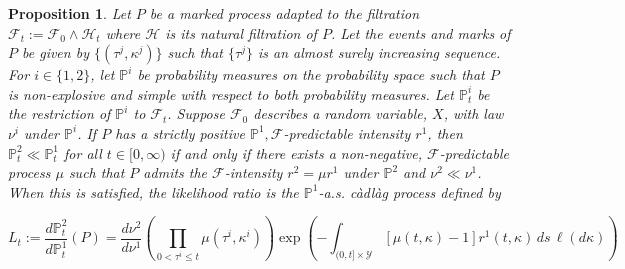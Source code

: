 \documentclass[12pt]{article}
\newcommand{\mb}{\mathbb}
\newcommand{\mc}{\mathcal}
\newcommand{\pr}{\mb{P}}							%
\newcommand{\indx}[1]{^{#1}}						%
\newcommand{\Xf}{X}									%
\newcommand{\Sm}{\ell}								%
\newcommand{\rate}{r}								%
\newcommand{\F}{\mc{F}}								%
\newcommand{\m}{\mu}								%
\newcommand{\tpara}[1]{_{#1}}						%
\newcommand{\spce}{\mc{Y}}							%
\newcommand{\rt}{\tau}								%
\renewcommand{\mark}{\kappa}						%
\newcommand{\rp}{P}									%
\newcommand{\mm}{\nu}								%
\newtheorem{prop}[thms]{Proposition}
\begin{document}
\begin{prop}
Let \(\rp\) be a marked process adapted to the filtration \(\F\tpara{t} := \F\tpara{0}\wedge \mc{H}\tpara{t}\) where \(\mc{H}\) is its natural filtration of \(\rp\). Let the events and marks of \(\rp\) be given by \(\{(\rt\indx{j},\mark\indx{j})\}\) such that \(\{\rt\indx{j}\}\) is an almost surely increasing sequence. For \(i \in \{1,2\}\), let \(\pr\indx{i}\) be probability measures on the probability space such that \(\rp\) is non-explosive and simple with respect to both probability measures. Let \(\pr\indx{i}\tpara{t}\) be the restriction of \(\pr\indx{i}\) to \(\F\tpara{t}\). Suppose \(\F\tpara{0}\) describes a random variable, \(\Xf\), with law \(\mm\indx{i}\) under \(\pr\indx{i}\). If \(\rp\) has a strictly positive \(\pr\indx{1},\F\)-predictable intensity \(\rate\indx{1}\), then \(\pr\indx{2}\tpara{t} \ll \pr\indx{1}\tpara{t}\) for all \(t \in [0,\infty)\) if and only if there exists a non-negative, \(\F\)-predictable process \(\m\) such that \(\rp\) admits the \(\F\)-intensity \(\rate^2 = \m\rate^1\) under \(\pr\indx{2}\) and \(\mm^2 \ll \mm^1\). When this is satisfied, the likelihood ratio is the \(\pr\indx{1}\)-a.s. c\`adl\`ag process defined by 

\begin{equation}
L_t:= \frac{d\pr\indx{2}\tpara{t}}{d\pr\indx{1}\tpara{t}}(\rp) = \frac{d\mm^2}{d\mm^1}\left(\prod_{0<\rt^i\leq t} \m(\rt^i,\mark^i)\right)\exp\left(-\int_{(0,t]\times \spce}[\m(t,\mark) - 1]\rate^1(t,\mark)\,ds\,\Sm(d\mark)\right)
\label{ref::Lnat}
\end{equation}
\label{ref::radnikder}
\end{prop}
\end{document}
